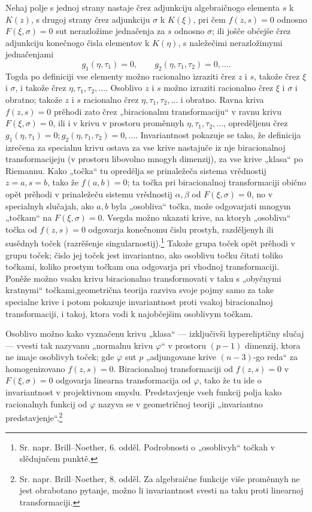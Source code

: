 \documentclass[11pt]{article}
\begin{document}
Nehaj polje s jednoj strany nastaje črez adjunkciju algebraičnogo elementa \(s\) k \(K(z)\), s drugoj strany črez adjunkciju \(\sigma\) k \(K(\xi)\), pri čem \(f(z,s)=0\) odnosno \(F(\xi,\sigma)=0\) sut nerazložime jednačenja za \(s\) odnosno \(\sigma\); ili jošče obćejše črez adjunkciju konečnogo čisla elementov k \(K(\eta)\), s naležečimi nerazložimymi jednačenjami
\[
g_1(\eta,\tau_1)=0,\qquad g_2(\eta,\tau_1,\tau_2)=0,\ldots .
\]
Togda po definiciji vse elementy možno racionalno izraziti črez \(z\) i \(s\), takože črez \(\xi\) i \(\sigma\), i takože črez \(\eta,\tau_1,\tau_2,\ldots\). Osoblivo \(z\) i \(s\) možno izraziti racionalno črez \(\xi\) i \(\sigma\) i obratno; takože \(z\) i \(s\) racionalno črez \(\eta,\tau_1,\tau_2,\ldots\) i obratno. Ravna kriva \(f(z,s)=0\) prěhodi zato črez „biracionalnu transformaciju“ v ravnu krivu \(F(\xi,\sigma)=0\), ili i v krivu v prostoru proměnnyh \(\eta,\tau_1,\tau_2,\ldots\), opreděljenu črez \(g_1(\eta,\tau_1)=0; g_2(\eta,\tau_1,\tau_2)=0,\ldots\). Invariantnost pokazuje se tako, že definicija izrečena za specialnu krivu ostava za vse krive nastajuče iz nje biracionalnoj transformacijeju (v prostoru libovolno mnogyh dimenzij), za vse krive „klasa“ po Riemannu. Kako „točka“ tu opredělja se prinaležeča sistema vrědnostij \(z=a,s=b\), tako že \(f(a,b)=0\); ta točka pri biracionalnoj transformaciji obično opět prěhodi v prinaležeču sistemu vrědnostij \(\alpha,\beta\) od \(F(\xi,\sigma)=0\), no v specialnyh slučajah, ako \(a,b\) byla „osobliva“ točka, može odgovarjati mnogym „točkam“ na \(F(\xi,\sigma)=0\). Vsegda možno ukazati krive, na ktoryh „osobliva“ točka od \(f(z,s)=0\) odgovarja konečnomu čislu prostyh, razděljenyh ili susědnyh toček (razrěšenje singularnostij).\footnote{Sr. napr. Brill--Noether, 6. odděl. Podrobnosti o „osoblivyh“ točkah v slědujučem punktě.} Takože grupa toček opět prěhodi v grupu toček; čislo jej toček jest invariantno, ako osoblivu točku čitati toliko točkami, koliko prostym točkam ona odgovarja pri vhodnoj transformaciji. Poněže možno vsaku krivu biracionalno transformovati v taku s „obyčnymi kratnymi“ točkami,\footnotemark[\value{footnote}] geometrična teorija razviva svoje pojmy samo za take specialne krive i potom pokazuje invariantnost proti vsakoj biracionalnoj transformaciji, i takoj, ktora vodi k najobčejšim osoblivym točkam.

Osoblivo možno kako vyznačenu krivu „klasa“ --- izključivši hypereliptičny slučaj --- vvesti tak nazyvanu „normalnu krivu \(\varphi\)“ v prostoru \((p-1)\) dimenzij, ktora ne imaje osoblivyh toček; gde \(\varphi\) sut \(p\) „adjungovane krive \((n-3)\)-go reda“ za homogenizovano \(f(z,s)=0\). Biracionalnoj transformaciji od \(f(z,s)=0\) v \(F(\xi,\sigma)=0\) odgovarja linearna transformacija od \(\varphi\), tako že tu ide o invariantnost v projektivnom smyslu. Predstavjenje vseh funkcij polja kako racionalnyh funkcij od \(\varphi\) nazyva se v geometričnoj teoriji „invariantno predstavjenje“.\footnote{Sr. napr. Brill--Noether, 8. odděl. Za algebraične funkcije više proměnnyh ne jest obrabotano pytanje, možno li invariantnost svesti na taku proti linearnoj transformaciji.}
\end{document}
